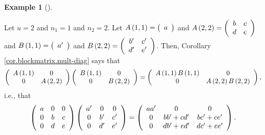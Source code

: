 \documentclass[numbers=enddot,12pt,final,onecolumn,notitlepage]{scrartcl}%
\numberwithin{exer}{subsection}
\theoremstyle{definition}
\newtheorem{exam}[theo]{Example}
\newenvironment{example}[1][]
{\begin{exam}[#1]\begin{leftbar}}
{\end{leftbar}\end{exam}}
\begin{document}
\begin{example}
Let $u=2$ and $n_{1}=1$ and $n_{2}=2$. Let $A\left(  1,1\right)  =\left(
\begin{array}
[c]{c}%
a
\end{array}
\right)  $ and $A\left(  2,2\right)  =\left(
\begin{array}
[c]{cc}%
b & c\\
d & e
\end{array}
\right)  $ and $B\left(  1,1\right)  =\left(
\begin{array}
[c]{c}%
a^{\prime}%
\end{array}
\right)  $ and $B\left(  2,2\right)  =\left(
\begin{array}
[c]{cc}%
b^{\prime} & c^{\prime}\\
d^{\prime} & e^{\prime}%
\end{array}
\right)  $. Then, Corollary \ref{cor.blockmatrix.mult-diag} says that%
\[
\left(
\begin{array}
[c]{cc}%
A\left(  1,1\right)  & 0\\
0 & A\left(  2,2\right)
\end{array}
\right)  \left(
\begin{array}
[c]{cc}%
B\left(  1,1\right)  & 0\\
0 & B\left(  2,2\right)
\end{array}
\right)  =\left(
\begin{array}
[c]{cc}%
A\left(  1,1\right)  B\left(  1,1\right)  & 0\\
0 & A\left(  2,2\right)  B\left(  2,2\right)
\end{array}
\right)  ,
\]
i.e., that%
\[
\left(
\begin{array}
[c]{ccc}%
a & 0 & 0\\
0 & b & c\\
0 & d & e
\end{array}
\right)  \left(
\begin{array}
[c]{ccc}%
a^{\prime} & 0 & 0\\
0 & b^{\prime} & c^{\prime}\\
0 & d^{\prime} & e^{\prime}%
\end{array}
\right)  =\left(
\begin{array}
[c]{ccc}%
aa^{\prime} & 0 & 0\\
0 & bb^{\prime}+cd^{\prime} & bc^{\prime}+ce^{\prime}\\
0 & db^{\prime}+ed^{\prime} & dc^{\prime}+ee^{\prime}%
\end{array}
\right)  .
\]

\end{example}
\end{document}
